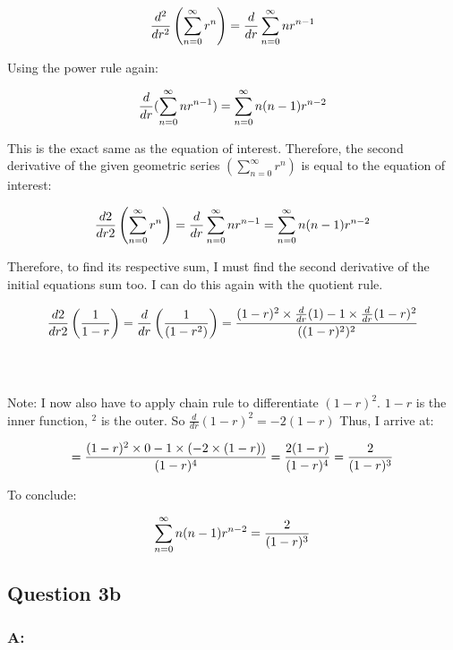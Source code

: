 \documentclass[
]{article}
\begin{document}
\[
\Large \frac{d^2}{dr^2} \left( \sum_{n=0}^{\infty} r^n \right) = \frac{d}{dr} \sum_{n=0}^{\infty} n r^{n-1}
\]

Using the power rule again:

\[
\Large
\frac{d}{dr}(\sum_{n=0}^{\infty} nr^{n-1})
= \sum_{n=0}^{\infty}n(n-1)r^{n-2}
\]

This is the exact same as the equation of interest. Therefore, the
second derivative of the given geometric series
\(( \sum_{n=0}^{\infty} r^n)\) is equal to the equation of interest:

\[
\Large
\frac{d2}{dr2} \left( \sum_{n=0}^{\infty} r^n \right) = \frac{d}{dr}\sum_{n=0}^{\infty} nr^{n-1} = \sum_{n=0}^{\infty}n(n-1)r^{n-2}
\]

Therefore, to find its respective sum, I must find the second derivative
of the initial equations sum too. I can do this again with the quotient
rule.

\[
\Large
\frac{d2}{dr2} \left( \frac{1}{1 - r} \right) =
\frac{d}{dr} \left( \frac{1}{(1 - r^2)} \right) =
\frac{(1-r)^2\times\frac{d}{dr}(1)-1 \times \frac{d}{dr}(1-r)^2}{((1-r)^2)^2}
\]\\
\strut \\

Note: I now also have to apply chain rule to differentiate \((1-r)^2\).
\(1-r\) is the inner function, \(^2\) is the outer. So
\(\frac{d}{dr}(1-r)^2 = -2(1-r)\) Thus, I arrive at:

\hfill\break
\[
\Large
= \frac{(1-r)^2\times0-1 \times (-2\times(1-r))}{(1-r)^4}=\frac{2(1-r)}{(1-r)^4} =\frac{2}{(1-r)^3}
\]

To conclude:

\[
\Large
\sum_{n=0}^{\infty}n(n-1)r^{n-2} =\frac{2}{(1-r)^3}
\]

\hfill\break
\hfill\break
\hfill\break
\hfill\break
\hfill\break

\hfill\break

\hfill\break
\hfill\break
\hfill\break

\hfill\break
\hfill\break
\hfill\break

\subsection{Question 3b}\label{question-3b}

\subsubsection{A:}\label{a}
\end{document}

